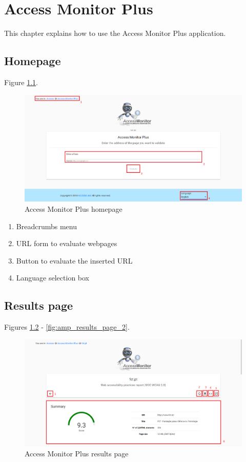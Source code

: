 \chapter{Access Monitor Plus}

This chapter explains how to use the Access Monitor Plus application.

\section{Homepage}

Figure \ref{fig:amp_homepage}.

\begin{figure}[H]
    \centering
    \includegraphics[width=\linewidth]{lib/images/amp/amp_homepage.png}
    \caption{Access Monitor Plus homepage}
    \label{fig:amp_homepage}
\end{figure}

\begin{enumerate}
    \item Breadcrumbs menu
    \item URL form to evaluate webpages
    \item Button to evaluate the inserted URL
    \item Language selection box
\end{enumerate}

\section{Results page}
\label{sec:amp_results_page}

Figures \ref{fig:amp_results_page} - \ref{fig:amp_results_page_2}.

\begin{figure}[H]
    \centering
    \includegraphics[width=\linewidth]{lib/images/amp/amp_results_page.png}
    \caption{Access Monitor Plus results page}
    \label{fig:amp_results_page}
\end{figure}

